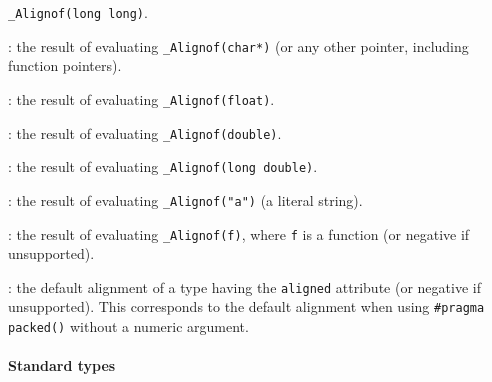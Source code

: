 \begin{description}
    \verb+_Alignof(long long)+.
  \item[\texttt{alignof\_ptr}]: the result of evaluating \verb+_Alignof(char*)+
    (or any other pointer, including function pointers).
  \item[\texttt{alignof\_float}]: the result of evaluating
    \verb+_Alignof(float)+.
  \item[\texttt{alignof\_double}]: the result of evaluating
    \verb+_Alignof(double)+.
  \item[\texttt{alignof\_longdouble}]: the result of evaluating
    \verb+_Alignof(long double)+.
  \item[\texttt{alignof\_str}]: the result of evaluating \verb+_Alignof("a")+
    (a literal string).
  \item[\texttt{alignof\_fun}]: the result of evaluating \verb+_Alignof(f)+,
    where \verb+f+ is a function (or negative if unsupported).
  \item[\texttt{alignof\_aligned}]: the default alignment of a type having the
    \verb+aligned+ attribute (or negative if unsupported). This corresponds to
    the default alignment when using \verb+#pragma packed()+ without a numeric
    argument.
\end{description}

\paragraph{Standard types}

